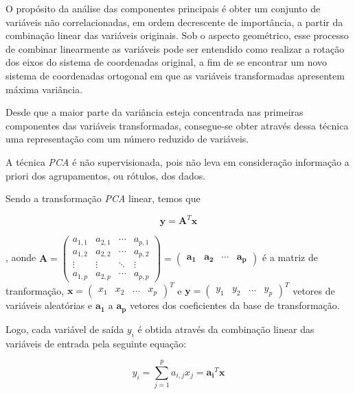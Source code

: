O propósito da análise das componentes principais é obter um conjunto de variáveis não correlacionadas, em ordem decrescente de importância, a partir da combinação linear das variáveis originais. Sob o aspecto geométrico, esse processo de combinar linearmente as variáveis pode ser entendido como realizar a rotação dos eixos do sistema de coordenadas original, a fim de se encontrar um novo sistema de coordenadas ortogonal em que as variáveis transformadas apresentem máxima variância. 

Desde que a maior parte da variância esteja concentrada nas primeiras componentes das variáveis transformadas, consegue-se obter através dessa técnica uma representação com um número reduzido de variáveis.

A técnica \emph{PCA} é não supervisionada, pois não leva em consideração informação a priori dos agrupamentos, ou rótulos, dos dados.  

Sendo a transformação \emph{PCA} linear, temos que

\begin{equation}\label{eq:PCA1}
\mathbf{y}=\mathbf{A}^T\mathbf{x}
\end{equation}

, aonde $ \mathbf{A} = \begin{pmatrix}
  a_{1,1} & a_{2,1} & \cdots & a_{p,1} \\
  a_{1,2} & a_{2,2} & \cdots & a_{p,2} \\
  \vdots  & \vdots  & \ddots & \vdots  \\
  a_{1,p} & a_{2,p} & \cdots & a_{p,p}
 \end{pmatrix} = 
 \begin{pmatrix}
 \mathbf{a_{1}}&
 \mathbf{a_{2}}&
 \cdots&
 \mathbf{a_{p}}
 \end{pmatrix}$ é a matriz de tranformação, $\mathbf{x} = \begin{pmatrix} x_1&x_2&\ldots&x_p\end{pmatrix}^T$ e $\mathbf{y} = \begin{pmatrix}y_1&y_2&\ldots&y_p\end{pmatrix}^T$ vetores de variáveis aleatórias e $\mathbf{a_1}\text{ a }\mathbf{a_p}$ vetores dos coeficientes da base de transformação.
 
Logo, cada variável de saída $y_i$ é obtida através da combinação linear das variáveis de entrada pela seguinte equação:
 
 \begin{equation}\label{eq:PCA2}
 y_i = \sum\limits_{j = 1}^p a_{i,j}x_j = \mathbf{a_i}^T\mathbf{x}
 \end{equation}


